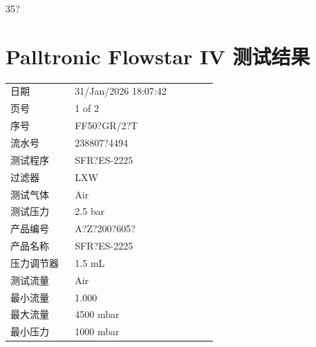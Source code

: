 \documentclass[UTF8,10pt,a4paper,fontset=fandol]{ctexart}
\newcommand{\fieldvalue}[1]{#1}
\newcommand{\handwritten}[1]{#1}
\begin{document}
\handwritten{35?}

\newpage

\section*{Palltronic Flowstar IV 测试结果}

\noindent
\begin{tabular}{@{}p{0.28\linewidth}p{0.62\linewidth}@{}}
日期 & 
\fieldvalue{31/Jan/2026 18:07:42} \\[2pt]
页号 & 
\fieldvalue{1 of 2} \\[2pt]
序号 & 
\fieldvalue{FF50?GR/2?T} \\[2pt]
流水号 & 
\fieldvalue{238807?4494} \\[2pt]
测试程序 & 
\fieldvalue{SFR?ES-2225} \\[2pt]
过滤器 & 
\fieldvalue{LXW} \\[2pt]
测试气体 & 
\fieldvalue{Air} \\[2pt]
测试压力 & 
\fieldvalue{2.5 bar} \\[2pt]
产品编号 & 
\fieldvalue{A?Z?200?605?} \\[2pt]
产品名称 & 
\fieldvalue{SFR?ES-2225} \\[2pt]
压力调节器 & 
\fieldvalue{1.5 mL} \\[2pt]
测试流量 & 
\fieldvalue{Air} \\[2pt]
最小流量 & 
\fieldvalue{1.000} \\[2pt]
最大流量 & 
\fieldvalue{4500 mbar} \\[2pt]
最小压力 & 
\fieldvalue{1000 mbar} \\
\end{tabular}
\end{document}
